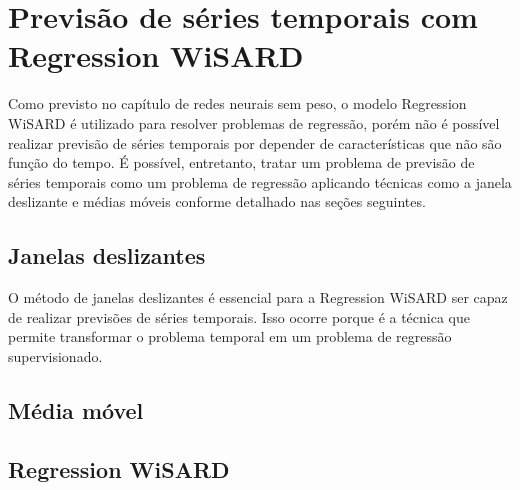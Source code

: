 \chapter{Previsão de séries temporais com Regression WiSARD}
Como previsto no capítulo de redes neurais sem peso, o modelo Regression WiSARD é utilizado para resolver problemas de regressão, porém não é possível realizar previsão de séries temporais por depender de características que não são função do tempo. É possível, entretanto, tratar um problema de previsão de séries temporais como um problema de regressão aplicando técnicas como a janela deslizante e médias móveis conforme detalhado nas seções seguintes.

\section{Janelas deslizantes}
O método de janelas deslizantes é essencial para a Regression WiSARD ser capaz de realizar previsões de séries temporais. Isso ocorre porque é a técnica que permite transformar o problema temporal em um problema de regressão supervisionado.



\section{Média móvel}




\section{Regression WiSARD}


